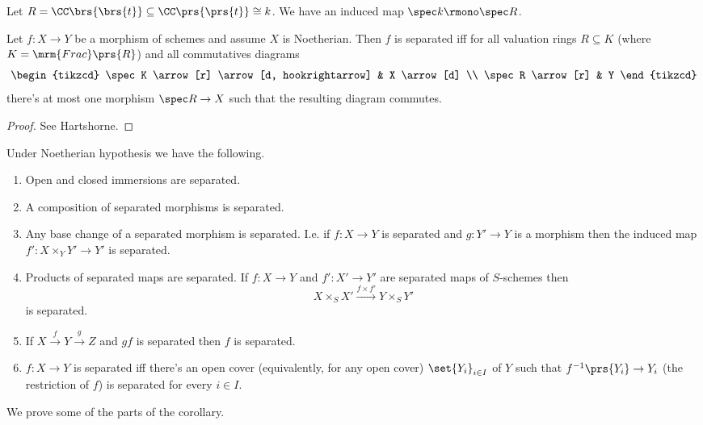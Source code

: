 \documentclass[10pt,a4paper,twoside,openany,hidelinks]{book}
\begin{document}
\begin{example}
Let $R = \CC\brs{\brs{t}} \subseteq \CC\prs{\prs{t}} \cong k$. We have an induced map $\spec k \rmono \spec R$.
\end{example}

\begin{theorem}
Let $f \colon X \to Y$ be a morphism of schemes and assume $X$ is Noetherian. Then $f$ is separated iff for all valuation rings $R \subseteq K$ (where $K = \mrm{Frac}\prs{R}$) and all commutatives diagrams
$$
\begin{tikzcd}
\spec K \arrow[r] \arrow[d, hookrightarrow] & X \arrow[d] \\ \spec R \arrow[r] & Y
\end{tikzcd}
$$
there's at most one morphism $\spec R \to X$ such that the resulting diagram commutes.
\end{theorem}

\begin{proof}
See Hartshorne.
\end{proof}

\begin{corollary}
Under Noetherian hypothesis we have the following.
\begin{enumerate}
    \item Open and closed immersions are separated.
    \item A composition of separated morphisms is separated.
    \item Any base change of a separated morphism is separated.
    I.e. if $f \colon X \to Y$ is separated and $g \colon Y' \to Y$ is a morphism then the induced map $f' \colon X \times_Y Y' \to Y'$ is separated.
    \item Products of separated maps are separated. If $f \colon X \to Y$ and $f' \colon X' \to Y'$ are separated maps of $S$-schemes then
    $$X \times_S X' \xrightarrow{f \times f'} Y \times_S Y'$$ is separated.
    \item If $X \xrightarrow{f} Y \xrightarrow{g} Z$ and $gf$ is separated then $f$ is separated.
    \item $f \colon X \to Y$ is separated iff there's an open cover (equivalently, for any open cover) $\set{Y_i}_{i \in I}$ of $Y$ such that $f^{-1}\prs{Y_i} \to Y_i$ (the restriction of $f$) is separated for every $i \in I$.
\end{enumerate}
\end{corollary}

We prove some of the parts of the corollary.
\end{document}
